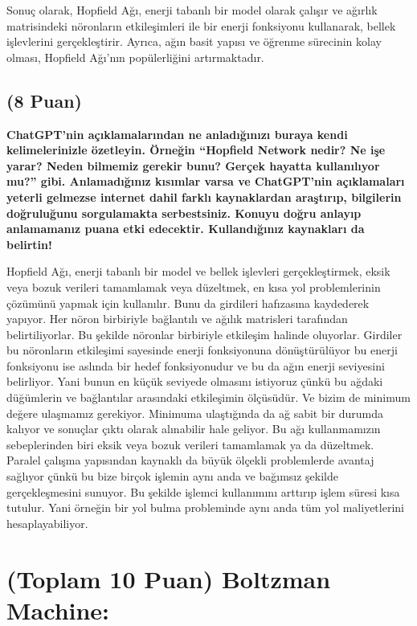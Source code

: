 \documentclass[11pt]{article}
\begin{document}
Sonuç olarak, Hopfield Ağı, enerji tabanlı bir model olarak çalışır ve ağırlık matrisindeki nöronların etkileşimleri ile bir enerji fonksiyonu kullanarak, bellek işlevlerini gerçekleştirir. Ayrıca, ağın basit yapısı ve öğrenme sürecinin kolay olması, Hopfield Ağı'nın popülerliğini artırmaktadır.









\subsection{(8 Puan)} \textbf{ChatGPT’nin açıklamalarından ne anladığınızı buraya kendi kelimelerinizle özetleyin. Örneğin ``Hopfield Network nedir? Ne işe yarar? Neden bilmemiz gerekir bunu? Gerçek hayatta kullanılıyor mu?'' gibi. Anlamadığınız kısımlar varsa ve ChatGPT’nin açıklamaları yeterli gelmezse internet dahil farklı kaynaklardan araştırıp, bilgilerin doğruluğunu sorgulamakta serbestsiniz. Konuyu doğru anlayıp anlamamanız puana etki edecektir. Kullandığınız kaynakları da belirtin!}

Hopfield Ağı, enerji tabanlı bir model ve bellek işlevleri gerçekleştirmek, eksik veya bozuk verileri tamamlamak veya düzeltmek, en kısa yol problemlerinin çözümünü yapmak için kullanılır. Bunu da girdileri hafızasına kaydederek yapıyor. Her nöron birbiriyle bağlantılı ve ağılık matrisleri tarafından belirtiliyorlar. Bu şekilde nöronlar birbiriyle etkileşim halinde oluyorlar. Girdiler bu nöronların etkileşimi sayesinde enerji fonksiyonuna dönüştürülüyor bu enerji fonksiyonu ise aslında bir hedef fonksiyonudur ve bu da ağın enerji seviyesini belirliyor. Yani bunun en küçük seviyede olmasını istiyoruz çünkü bu ağdaki düğümlerin ve bağlantılar arasındaki etkileşimin ölçüsüdür. Ve bizim de minimum değere ulaşmamız gerekiyor. Minimuma ulaştığında da ağ sabit bir durumda kalıyor ve sonuçlar çıktı olarak alınabilir hale geliyor. Bu ağı kullanmamızın sebeplerinden biri eksik veya bozuk verileri tamamlamak ya da düzeltmek. Paralel çalışma yapısından kaynaklı da büyük ölçekli problemlerde avantaj sağlıyor çünkü bu bize birçok işlemin aynı anda ve bağımsız şekilde gerçekleşmesini sunuyor. Bu şekilde işlemci kullanımını arttırıp işlem süresi kısa tutulur. Yani örneğin bir yol bulma probleminde aynı anda tüm yol maliyetlerini hesaplayabiliyor.

\section{(Toplam 10 Puan) Boltzman Machine:}
\end{document}
